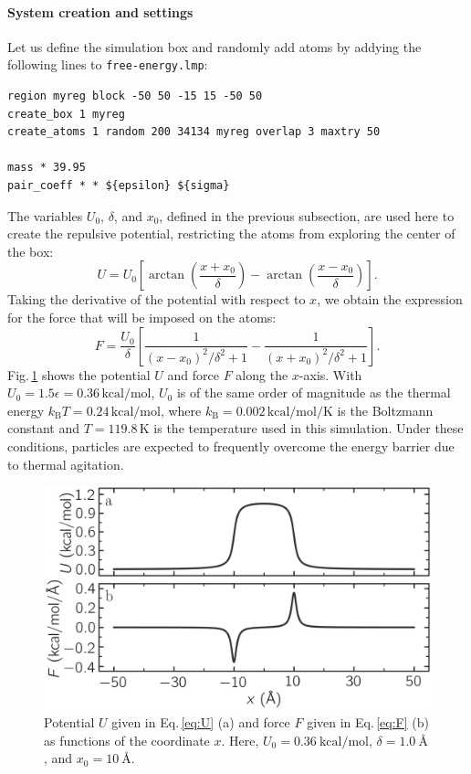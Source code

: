 \documentclass[9pt,tutorial]{livecoms}
\newcommand{\flecmd}[1]{\textcolor{command}{\texttt{#1}}} %
\begin{document}
\paragraph{System creation and settings}

Let us define the simulation box and randomly add atoms by addying the
following lines to \flecmd{free-energy.lmp}:
\begin{lstlisting}
region myreg block -50 50 -15 15 -50 50
create_box 1 myreg
create_atoms 1 random 200 34134 myreg overlap 3 maxtry 50

mass * 39.95
pair_coeff * * ${epsilon} ${sigma}
\end{lstlisting}

The variables $U_0$, $\delta$, and $x_0$, defined in the previous subsection, are
used here to create the repulsive potential, restricting the atoms from exploring
the center of the box:
\begin{equation}
U = U_0 \left[ \arctan \left( \dfrac{x+x_0}{\delta} \right)
- \arctan \left(\dfrac{x-x_0}{\delta} \right) \right].
\label{eq:U}
\end{equation}
Taking the derivative of the potential with respect to $x$, we obtain the expression
for the force that will be imposed on the atoms:
\begin{equation}
F = \dfrac{U_0}{\delta} \left[ \dfrac{1}{(x-x_0)^2/\delta^2+1}
- \dfrac{1}{(x+x_0)^2/\delta^2+1} \right].
\label{eq:F}
\end{equation}
Fig.\,\ref{fig:potential} shows the potential $U$ and force $F$ along the $x$-axis.
With $U_0 = 1.5 \epsilon = 0.36\,\text{kcal/mol}$, $U_0$ is of the same order of magnitude as the
thermal energy $k_\text{B} T = 0.24\,\text{kcal/mol}$, where $k_\text{B} = 0.002\,\text{kcal/mol/K}$
is the Boltzmann constant and $T = 119.8\,\text{K}$ is the temperature
used in this simulation.  Under these conditions, particles are expected to
frequently overcome the energy barrier due to thermal agitation.

\begin{figure}
\centering
\includegraphics[width=\linewidth]{US-potential}
\caption{Potential $U$ given in Eq.\,\eqref{eq:U} (a) and force $F$ given in
Eq.\,\eqref{eq:F} (b) as functions of the coordinate $x$. Here,
$U_0 = 0.36~\text{kcal/mol}$, $\delta = 1.0~\text{\AA{}}$, and $x_0 = 10~\text{\AA{}}$.}
\label{fig:potential}
\end{figure}
\end{document}
